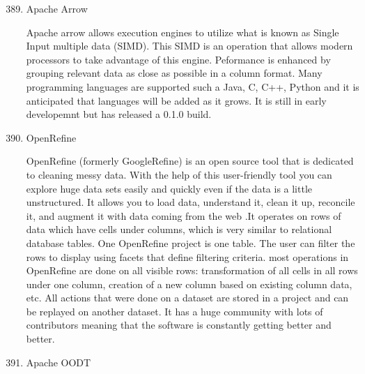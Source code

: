 \begin{enumerate}
\setcounter{enumi}{388}
\item {} 
Apache Arrow

Apache arrow allows execution engines to utilize what is known as
Single Input multiple data (SIMD).  \label{\detokenize{i524/technologies:id709}}{\hyperref[\detokenize{i524/technologies:www-arrow}]{\sphinxcrossref{{[}619{]}}}} This SIMD
is an operation that allows modern processors to take advantage
of this engine.  Peformance is enhanced by grouping relevant data
as close as possible in a column format.  Many programming
languages are supported such a Java, C, C++, Python and it is
anticipated that languages will be added as it grows.  It is
still in early developemnt but has released a 0.1.0 build.

\item {} 
OpenRefine

OpenRefine (formerly GoogleRefine) is an open source tool that is
dedicated to cleaning messy data. With the help of this
user-friendly tool you can explore huge data sets easily and
quickly even if the data is a little unstructured. It allows you
to load data, understand it, clean it up, reconcile it, and
augment it with data coming from the web
\label{\detokenize{i524/technologies:id710}}{\hyperref[\detokenize{i524/technologies:www-openrefine}]{\sphinxcrossref{{[}620{]}}}}.It operates on rows of data which have
cells under columns, which is very similar to relational database
tables. One OpenRefine project is one table. The user can filter
the rows to display using facets that define filtering
criteria. most operations in OpenRefine are done on all visible
rows: transformation of all cells in all rows under one column,
creation of a new column based on existing column data, etc. All
actions that were done on a dataset are stored in a project and
can be replayed on another dataset. It has a huge community with
lots of contributors meaning that the software is constantly
getting better and better.

\item {} 
Apache OODT


\end{enumerate}
